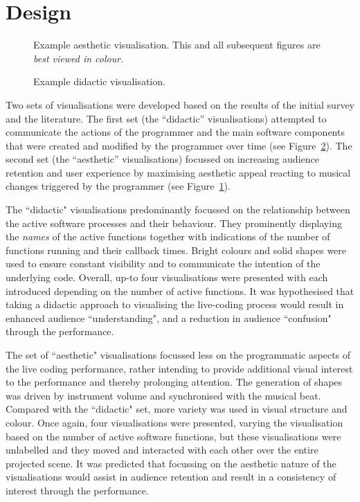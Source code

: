 \documentclass{sig-alternate}
\begin{document}
\section{Design}

\begin{figure}
\centering
{}
\caption{Example aesthetic visualisation. This and all subsequent figures are \textit{best viewed in colour}.}
\label{fig:aesthetic-visualisation}
\end{figure}

\begin{figure}
\centering
{}
\caption{Example didactic visualisation.}
\label{fig:didactic-visualisation}
\end{figure}

Two sets of visualisations were developed based on the results of the initial survey and the literature. The first set (the ``didactic'' visualisations) attempted to communicate the actions of the programmer and the main software components that were created and modified by the programmer over time (see Figure~\ref{fig:didactic-visualisation}). The second set (the ``aesthetic'' visualisations) focussed on increasing audience retention and user experience by maximising aesthetic appeal \cite{Cawthon2007} reacting to musical changes triggered by the programmer (see Figure~\ref{fig:aesthetic-visualisation}).

The ``didactic" visualisations predominantly focussed on the relationship between the active software processes and their behaviour. They prominently displaying the \textit{names} of the active functions together with indications of the number of functions running and their callback times. Bright colours and solid shapes were used to ensure constant visibility and to communicate the intention of the underlying code. Overall, up-to four visualisations were presented with each introduced depending on the number of active functions. It was hypothesised that taking a didactic approach to visualising the live-coding process would result in enhanced audience ``understanding", and a reduction in audience ``confusion" through the performance.

The set of ``aesthetic" visualisations focussed less on the programmatic aspects of the live coding performance, rather intending to provide additional visual interest to the performance and thereby prolonging attention. The generation of shapes was driven by instrument volume and synchronised with the musical beat. Compared with the ``didactic" set, more variety was used in visual structure and colour. Once again, four visualisations were presented, varying the visualisation based on the number of active software functions, but these visualisations were unlabelled and they moved and interacted with each other over the entire projected scene. It was predicted that focussing on the aesthetic nature of the visualisations would assist in audience retention and result in a consistency of interest through the performance.
\end{document}
